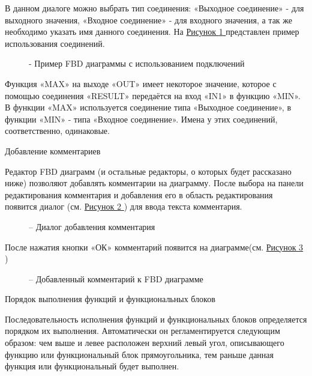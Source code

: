 \documentclass[letterpaper,10pt,russian]{sphinxmanual}
\begin{document}
В данном диалоге можно выбрать тип соединения: «Выходное соединение» -
для выходного значения, «Входное соединение» - для входного значения, а
так же необходимо указать имя данного соединения. На \hyperref[usage_guide/ide_components:image65]{Рисунок \ref{usage_guide/ide_components:image65} } представлен
пример использования соединений.
\begin{figure}[htbp]
\centering
\capstart

\noindent{}
\caption{- Пример FBD диаграммы с использованием подключений}\label{usage_guide/ide_components:image65}\end{figure}

Функция «MAX» на выходе «OUT» имеет некоторое значение, которое с
помощью соединения «RESULT» передаётся на вход «IN1» в функцию «MIN». В
функции «MAX» используется соединение типа «Выходное соединение», в
функции «MIN» - типа «Входное соединение». Имена у этих соединений,
соответственно, одинаковые.

Добавление комментариев

Редактор FBD диаграмм (и остальные редакторы, о которых будет рассказано
ниже) позволяют добавлять комментарии на диаграмму. После выбора на
панели редактирования комментария и добавления его в область
редактирования появится диалог (см. \hyperref[usage_guide/ide_components:image66]{Рисунок \ref{usage_guide/ide_components:image66} }) для ввода текста
комментария.
\begin{figure}[htbp]
\centering
\capstart

\noindent{}
\caption{– Диалог добавления комментария}\label{usage_guide/ide_components:image66}\end{figure}

После нажатия кнопки «ОК» комментарий появится на диаграмме(см. \hyperref[usage_guide/ide_components:image67]{Рисунок \ref{usage_guide/ide_components:image67} })
\begin{figure}[htbp]
\centering
\capstart

\noindent{}
\caption{– Добавленный комментарий к FBD диаграмме}\label{usage_guide/ide_components:image67}\end{figure}

Порядок выполнения функций и функциональных блоков

Последовательность исполнения функций и функциональных блоков
определяется порядком их выполнения. Автоматически он регламентируется
следующим образом: чем выше и левее расположен верхний левый угол,
описывающего функцию или функциональный блок прямоугольника, тем раньше
данная функция или функциональный будет выполнен.
\end{document}
